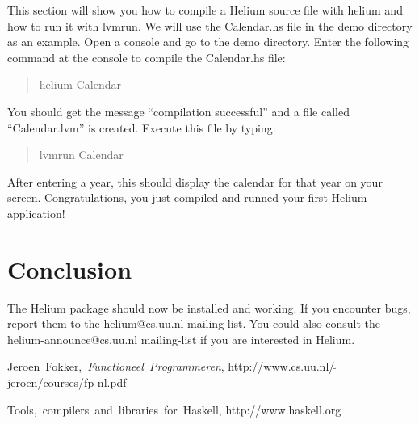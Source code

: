 \documentclass[pdftex,11pt,a4paper,notitlepage]{article}
\begin{document}
        This section will show you how to compile a Helium source file with helium and
        how to run it with lvmrun. We will use the Calendar.hs file in the demo directory
        as an example. Open a console and go to the demo directory. Enter the following
        command at the console to compile the Calendar.hs file:
        \begin{quote}
            helium Calendar
        \end{quote}
        You should get the message ``compilation successful'' and a file called
        ``Calendar.lvm'' is created. Execute this file by typing:
        \begin{quote}
            lvmrun Calendar
        \end{quote}
        After entering a year, this should display the calendar for
        that year on your screen. Congratulations,
        you just compiled and runned your first Helium application!
        

    \section{Conclusion}
    
        The Helium package should now be installed and working. If you encounter bugs,
        report them to the helium{@}cs.uu.nl mailing-list. You could also consult the
        helium-announce{@}cs.uu.nl mailing-list if you are interested in Helium.


    \begin{thebibliography}{10}

            \mbox{Jeroen Fokker, \emph{Functioneel Programmeren}}, \mbox{http://www.cs.uu.nl/$\,\tilde{}\,$jeroen/courses/fp-nl.pdf}

            \mbox{Tools, compilers and libraries for Haskell}, \mbox{http://www.haskell.org}

    \end{thebibliography}
\end{document}
